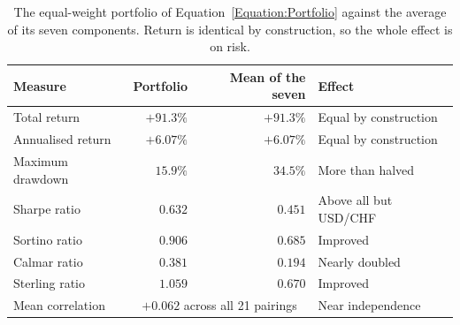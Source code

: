 \begin{table}[htb!]
\centering
\footnotesize
\begin{tabular}{@{}lrrl@{}}
\toprule
\textbf{Measure} & \textbf{Portfolio} & \textbf{Mean of the seven} & \textbf{Effect} \\
\midrule
Total return & $+91.3\%$ & $+91.3\%$ & Equal by construction \\
Annualised return & $+6.07\%$ & $+6.07\%$ & Equal by construction \\
\addlinespace
Maximum drawdown & $\mathbf{15.9\%}$ & $34.5\%$ & More than halved \\
Sharpe ratio & $\mathbf{0.632}$ & $0.451$ & Above all but USD/CHF \\
Sortino ratio & $0.906$ & $0.685$ & Improved \\
Calmar ratio & $0.381$ & $0.194$ & Nearly doubled \\
Sterling ratio & $1.059$ & $0.670$ & Improved \\
\addlinespace
Mean correlation & \multicolumn{2}{c}{$+0.062$ across all 21 pairings} & Near independence \\
\bottomrule
\end{tabular}
\caption{The equal-weight portfolio of Equation~\ref{Equation:Portfolio} against the average of its seven components. Return is identical by construction, so the whole effect is on risk.}
\label{Tables:Portfolio}
\end{table}